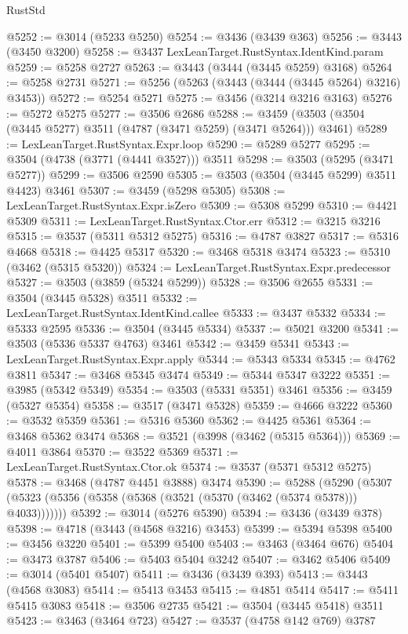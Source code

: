 \begin{lexlean}{RustStd}
\begin{coremodule}
@5252 := @3014 (@5233 @5250)
@5254 := @3436 (@3439 @363)
@5256 := @3443 (@3450 @3200)
@5258 := @3437 LexLeanTarget.RustSyntax.IdentKind.param
@5259 := @5258 @2727
@5263 := @3443 (@3444 (@3445 @5259) @3168)
@5264 := @5258 @2731
@5271 := @5256 (@5263 (@3443 (@3444 (@3445 @5264) @3216) @3453))
@5272 := @5254 @5271
@5275 := @3456 (@3214 @3216 @3163)
@5276 := @5272 @5275
@5277 := @3506 @2686
@5288 := @3459 (@3503 (@3504 (@3445 @5277) @3511 (@4787 (@3471 @5259) (@3471 @5264))) @3461)
@5289 := LexLeanTarget.RustSyntax.Expr.loop
@5290 := @5289 @5277
@5295 := @3504 (@4738 (@3771 (@4441 @3527))) @3511
@5298 := @3503 (@5295 (@3471 @5277))
@5299 := @3506 @2590
@5305 := @3503 (@3504 (@3445 @5299) @3511 @4423) @3461
@5307 := @3459 (@5298 @5305)
@5308 := LexLeanTarget.RustSyntax.Expr.isZero
@5309 := @5308 @5299
@5310 := @4421 @5309
@5311 := LexLeanTarget.RustSyntax.Ctor.err
@5312 := @3215 @3216
@5315 := @3537 (@5311 @5312 @5275)
@5316 := @4787 @3827
@5317 := @5316 @4668
@5318 := @4425 @5317
@5320 := @3468 @5318 @3474
@5323 := @5310 (@3462 (@5315 @5320))
@5324 := LexLeanTarget.RustSyntax.Expr.predecessor
@5327 := @3503 (@3859 (@5324 @5299))
@5328 := @3506 @2655
@5331 := @3504 (@3445 @5328) @3511
@5332 := LexLeanTarget.RustSyntax.IdentKind.callee
@5333 := @3437 @5332
@5334 := @5333 @2595
@5336 := @3504 (@3445 @5334)
@5337 := @5021 @3200
@5341 := @3503 (@5336 @5337 @4763) @3461
@5342 := @3459 @5341
@5343 := LexLeanTarget.RustSyntax.Expr.apply
@5344 := @5343 @5334
@5345 := @4762 @3811
@5347 := @3468 @5345 @3474
@5349 := @5344 @5347 @3222
@5351 := @3985 (@5342 @5349)
@5354 := @3503 (@5331 @5351) @3461
@5356 := @3459 (@5327 @5354)
@5358 := @3517 (@3471 @5328)
@5359 := @4666 @3222
@5360 := @3532 @5359
@5361 := @5316 @5360
@5362 := @4425 @5361
@5364 := @3468 @5362 @3474
@5368 := @3521 (@3998 (@3462 (@5315 @5364)))
@5369 := @4011 @3864
@5370 := @3522 @5369
@5371 := LexLeanTarget.RustSyntax.Ctor.ok
@5374 := @3537 (@5371 @5312 @5275)
@5378 := @3468 (@4787 @4451 @3888) @3474
@5390 := @5288
    (@5290 (@5307 (@5323 (@5356 (@5358 (@5368 (@3521 (@5370 (@3462 (@5374 @5378))) @4033)))))))
@5392 := @3014 (@5276 @5390)
@5394 := @3436 (@3439 @378)
@5398 := @4718 (@3443 (@4568 @3216) @3453)
@5399 := @5394 @5398
@5400 := @3456 @3220
@5401 := @5399 @5400
@5403 := @3463 (@3464 @676)
@5404 := @3473 @3787
@5406 := @5403 @5404 @3242
@5407 := @3462 @5406
@5409 := @3014 (@5401 @5407)
@5411 := @3436 (@3439 @393)
@5413 := @3443 (@4568 @3083)
@5414 := @5413 @3453
@5415 := @4851 @5414
@5417 := @5411 @5415 @3083
@5418 := @3506 @2735
@5421 := @3504 (@3445 @5418) @3511
@5423 := @3463 (@3464 @723)
@5427 := @3537 (@4758 @142 @769) @3787

\end{coremodule}
\end{lexlean}
